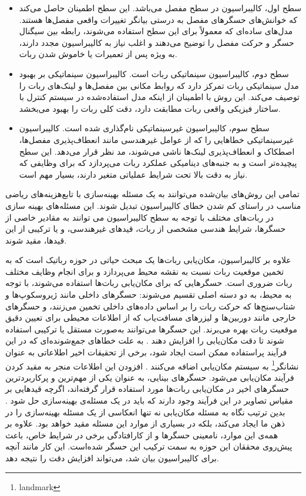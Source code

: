 \begin{itemize}
	\item سطح اول، کالیبراسیون در سطح مفصل می‌باشد. این سطح اطمینان حاصل می‌کند که خوانش‌های حسگرهای مفصل به درستی بیانگر تغییرات واقعی مفصل‌ها هستند. مدل‌های ساده‌ای که معمولاً برای این سطح استفاده می‌شوند، رابطه بین سیگنال حسگر و حرکت مفصل را توضیح می‌دهند و اغلب نیاز به کالیبراسیون مجدد دارند، به ویژه پس از تعمیرات یا خاموش شدن ربات.
	
	
	\item  سطح دوم، کالیبراسیون سینماتیکی ربات است. کالیبراسیون سینماتیکی بر بهبود مدل سینماتیکی ربات تمرکز دارد که روابط مکانی بین مفصل‌ها و لینک‌های ربات را توصیف می‌کند. این روش با اطمینان از اینکه مدل استفاده‌شده در سیستم کنترل با ساختار فیزیکی واقعی ربات مطابقت دارد، دقت کلی ربات را بهبود می‌بخشد. 
	
	
	\item  سطح سوم، کالیبراسیون غیرسینماتیکی نام‌گذاری شده است. کالیبراسیون غیرسینماتیکی خطاهایی را که از عوامل غیرهندسی مانند انعطاف‌پذیری مفصل‌ها، اصطکاک و انعطاف‌پذیری لینک‌ها ناشی می‌شوند، مد نظر قرار می‌دهد. این سطح پیچیده‌تر است و به جنبه‌های دینامیکی عملکرد ربات می‌پردازد که برای وظایفی که نیاز به دقت بالا تحت شرایط عملیاتی متغیر دارند، بسیار مهم است.
	
	
\end{itemize}
تمامی این روش‌های بیان‌شده می‌توانند به یک مسئله‌‌ بهینه‌سازی با تابع‌هزینه‌های ریاضی مناسب در راستای کم شدن خطای کالیبراسیون تبدیل شوند. این مسئله‌های بهینه سازی در ربات‌های مختلف با توجه به سطح کالیبراسیون می توانند به مقادیر خاصی از حسگرها، شرایط هندسی مشخصی از ربات، قیدهای غیرهندسی، و یا ترکیبی از این قیدها، مقید شوند. 

علاوه بر کالیبراسیون، مکان‌یابی ربات‌ها یک مبحث حیاتی در حوزه رباتیک است که به تخمین موقعیت ربات نسبت به نقشه محیط می‌پردازد و برای انجام وظایف مختلف ربات ضروری است. حسگرهایی که برای مکان‌یابی ربات‌ها استفاده می‌شوند، با توجه به محیط، به دو دسته اصلی تقسیم می‌شوند: حسگرهای داخلی مانند ژیروسکوپ‌ها و شتاب‌سنج‌ها که حرکت ربات را بر اساس داده‌های داخلی تخمین می‌زنند، و حسگرهای خارجی مانند دوربین‌ها و لیزرهای مسافت‌یاب که از اطلاعات محیطی برای تعیین دقیق موقعیت ربات بهره می‌برند. این حسگرها می‌توانند به‌صورت مستقل یا ترکیبی استفاده شوند تا دقت مکان‌یابی را افزایش دهند
\cite{malagon2015mobile, burgard1997active}.
به علت خطاهای جمع‌شونده‌ای که در این فرآیند پراستفاده ممکن است ایجاد شود، برخی از تحقیقات اخیر اطلاعاتی به عنوان نشانگر\footnote{landmark}
به سیستم مکان‌یابی اضافه می‌کنند
\cite{betke1997mobile}.
افزودن این اطلاعات منجر به مقید کردن فرآیند مکان‌یابی می‌شود. حسگر‌های بینایی، به عنوان یکی از مهم‌ترین و پرکاربردترین حسگر‌های اخیر در مکان‌یابی ربات‌ها مورد استفاده قرار گرفته‌اند، اگرچه قید‌هایی بر مقیاس تصاویر در این فرآیند وجود دارند که باید در یک مسئله‌ی بهینه‌سازی حل شود
\cite{Forster2014ICRA}.
 بدین ترتیب نگاه به مسئله مکان‌یابی نه تنها انعکاسی از یک مسئله بهینه‌سازی را در ذهن ما ایجاد می‌کند، بلکه در بسیاری از موارد این مسئله مقید خواهد بود. علاوه بر همه‌ی این موارد، نامعینی‌ حسگر‌ها و از کارافتادگی برخی در شرایط خاص، باعث پیش‌روی محققان این حوزه به سمت ترکیب این حسگر شده‌است. این کار مانند آنچه برای کالیبراسیون بیان شد، می‌تواند افزایش دقت را نتیجه دهد. 
 

